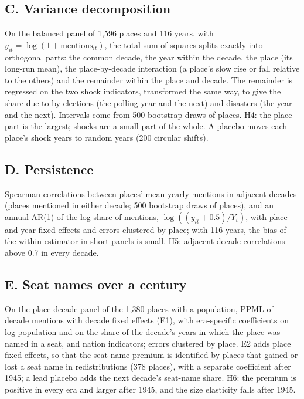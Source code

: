 \documentclass[11pt,a4paper]{article}
\begin{document}
\subsection{C. Variance decomposition}
On the balanced panel of 1,596 places and 116 years, with $y_{it} = \log(1 + \text{mentions}_{it})$, the total sum of squares splits exactly into orthogonal parts: the common decade, the year within the decade, the place (its long-run mean), the place-by-decade interaction (a place's slow rise or fall relative to the others) and the remainder within the place and decade. The remainder is regressed on the two shock indicators, transformed the same way, to give the share due to by-elections (the polling year and the next) and disasters (the year and the next). Intervals come from 500 bootstrap draws of places. H4: the place part is the largest; shocks are a small part of the whole. A placebo moves each place's shock years to random years (200 circular shifts).

\subsection{D. Persistence}
Spearman correlations between places' mean yearly mentions in adjacent decades (places mentioned in either decade; 500 bootstrap draws of places), and an annual AR(1) of the log share of mentions, $\log((y_{it}+0.5)/Y_t)$, with place and year fixed effects and errors clustered by place; with 116 years, the bias of the within estimator in short panels \citep{nickell1981} is small. H5: adjacent-decade correlations above 0.7 in every decade.

\subsection{E. Seat names over a century}
On the place-decade panel of the 1,380 places with a population, PPML of decade mentions with decade fixed effects (E1), with era-specific coefficients on log population and on the share of the decade's years in which the place was named in a seat, and nation indicators; errors clustered by place. E2 adds place fixed effects, so that the seat-name premium is identified by places that gained or lost a seat name in redistributions (378 places), with a separate coefficient after 1945; a lead placebo adds the next decade's seat-name share. H6: the premium is positive in every era and larger after 1945, and the size elasticity falls after 1945.
\end{document}
